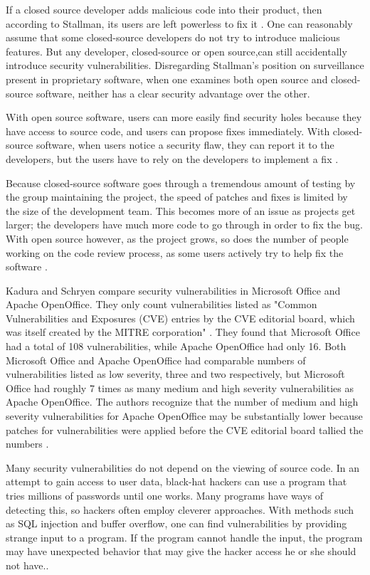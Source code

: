 ﻿If a closed source developer adds malicious code into their product, then
according to Stallman, its users are left powerless to fix it \citeyear[para. 36]{rms2011}.
One can reasonably assume that some closed-source developers do not try
to introduce malicious features. But any developer, closed-source or
open source,can still accidentally introduce security
vulnerabilities. Disregarding Stallman's position on surveillance present in
proprietary software, when one examines both open source and closed-source
software, neither has a clear security advantage over the other.

With open source software, users can more easily find security holes because
they have access to source code, and users can propose fixes immediately.
With closed-source software, when users notice a security flaw, they can report
it to the developers, but the users have to rely on the developers to implement a
fix \cite[para. 17]{kadura}.

Because closed-source software goes through a tremendous amount of testing
by the group maintaining the project, the speed of patches and fixes is limited
by the size of the development team. This becomes more of an issue as projects
get larger; the developers have much more code to go through in order to fix the
bug. With open source however, as the project grows, so does the number of
people working on the code review process, as some users actively try to help
fix the software \cite[p. ~245]{boulanger}.

Kadura and Schryen compare security vulnerabilities in Microsoft
Office and Apache OpenOffice. They only count vulnerabilities listed
as "Common Vulnerabilities and Exposures (CVE) entries by the CVE editorial
board, which was itself created by the MITRE corporation"
\citeyear{kadura}. They found that Microsoft Office had a total of 108
vulnerabilities, while Apache OpenOffice had only 16. Both Microsoft Office and
Apache OpenOffice had comparable numbers of vulnerabilities listed as low severity,
three and two respectively, but Microsoft Office had roughly 7 times as many
medium and high severity vulnerabilities as Apache OpenOffice. The authors recognize
that the number of medium and high severity vulnerabilities for Apache OpenOffice may
be substantially lower because patches for vulnerabilities were applied before
the CVE editorial board tallied the numbers \cite{kadura}.

Many security vulnerabilities do not depend on the viewing of source code.
In an attempt to gain access to user data, black-hat hackers can use a program
that tries millions of passwords until one works. Many programs have ways of
detecting this, so hackers often employ cleverer approaches. With methods
such as SQL injection and buffer overflow, one can find vulnerabilities by
providing strange input to a program. If the program cannot handle the input,
the program may have unexpected behavior that may give the hacker access he or she
should not have.\cite[p. ~8-9]{clarke}.

